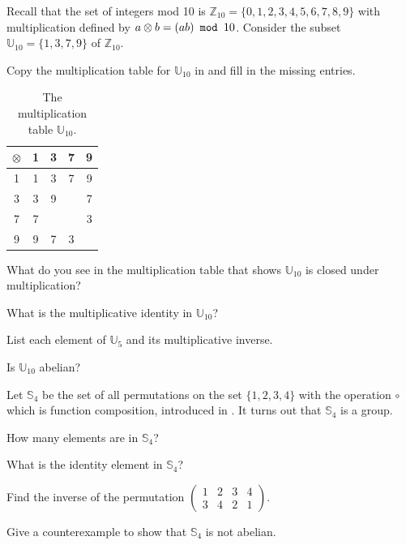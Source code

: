 \begin{exer}[\exerP] %
\label{exer_U10_mult_group}
    Recall that the set of integers mod 10 is $\mathbb{Z}_{10}=\{0,1,2,3,4,5,6,7,8,9\}$ with multiplication defined by $a \otimes b = (ab) \texttt{ mod } 10$. Consider the subset $\mathbb{U}_{10} = \{1, 3, 7, 9\}$ of $\mathbb{Z}_{10}$.
        \begin{exerpart}
            \item Copy the multiplication table for $\mathbb{U}_{10}$ in  and fill in the missing entries.
                \begin{table}[hbtp]
                    \centering
                    \begin{tabular}{c|cccc} 
                        $\otimes$ & 1 & 3 & 7 & 9 \\ \hline
                        1 & 1 & 3 & 7 & 9 \\
                        3 & 3 & 9 &  & 7 \\
                        7 & 7 &  &  & 3 \\
                        9 & 9 & 7 & 3 &  
                    \end{tabular}
                    \caption{The multiplication table  $\mathbb{U}_{10}$.}
                    \label{tab_mult_units_mod10}
                \end{table}
            \item What do you see in the multiplication table that shows $\mathbb{U}_{10}$ is closed under multiplication?
            \item What is the multiplicative identity in $\mathbb{U}_{10}$?
            \item List each element of $\mathbb{U}_5$ and its multiplicative inverse.
            \item Is $\mathbb{U}_{10}$ abelian?
        \end{exerpart}
\end{exer}

\begin{exer}[\exerU] %
\label{exer_S4_group}
    Let $\mathbb{S}_4$ be the set of all permutations on the set $\{1,2,3,4\}$ with the operation $\circ$ which is function composition, introduced in . It turns out that $\mathbb{S}_4$ is a group.
         \begin{exerpart}
             \item How many elements are in $\mathbb{S}_4$?
             \item What is the identity element in $\mathbb{S}_4$?
             \item Find the inverse of the permutation $\left( \begin{array} {cccc} 1 & 2 & 3 & 4 \\ 3 & 4 & 2 & 1 \end{array} \right)$.
             \item Give a counterexample to show that $\mathbb{S}_4$ is not abelian.
         \end{exerpart}
\end{exer}

